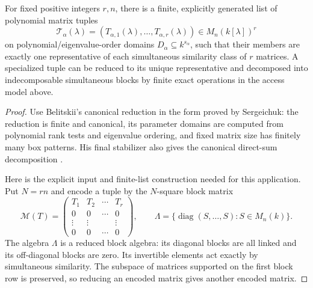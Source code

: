 \begin{lemma}
\label{C:canonical-tuples}
For fixed positive integers $r,n$, there is a finite, explicitly generated
list of polynomial matrix tuples
\[
 \mathcal T_\alpha(\lambda)
   =(T_{\alpha,1}(\lambda),\ldots,T_{\alpha,r}(\lambda))
       \in M_n(k[\lambda])^r
\]
on polynomial/eigenvalue-order domains $D_\alpha\subseteq k^{s_\alpha}$,
such that their members are exactly one representative of each simultaneous
similarity class of $r$ matrices. A specialized tuple can be reduced to its
unique representative and decomposed into indecomposable simultaneous
blocks by finite exact operations in the access model above.
\end{lemma}
\begin{proof}
Use Belitskii's canonical reduction in the form proved by Sergeichuk:
the reduction is finite and canonical, its parameter domains are computed
from polynomial rank tests and eigenvalue ordering, and fixed matrix size
has finitely many box patterns. His final stabilizer also gives the
canonical direct-sum decomposition
\cite[author version, \S1.4, pp.10--13; Theorems 1.3, 2.2, 2.3,
pp.13, 23--24, 27--28; Remark 2.1, p.28]{C-Sergeichuk2000}.

Here is the explicit input and finite-list construction needed for this
application. Put $N=rn$ and encode a tuple by the $N$-square block matrix
\[
 \mathcal M(T)=
 \begin{pmatrix}
 T_1&T_2&\cdots&T_r\\
 0&0&\cdots&0\\
 \vdots&\vdots&&\vdots\\
 0&0&\cdots&0
 \end{pmatrix},\qquad
 \Lambda=\{\operatorname{diag}(S,\ldots,S):S\in M_n(k)\}.
\]
The algebra $\Lambda$ is a reduced block algebra: its diagonal blocks are
all linked and its off-diagonal blocks are zero. Its invertible elements
act exactly by simultaneous similarity. The subspace of matrices supported
on the first block row is preserved, so reducing an encoded matrix gives
another encoded matrix.


\end{proof}
